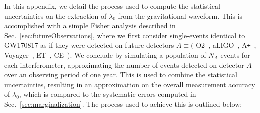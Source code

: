 \documentclass[prd,twocolumn,nofootinbib,superscriptaddress,amsmath,amssymb]{revtex4-1}
\begin{document}
In this appendix, we detail the process used to compute the statistical uncertainties on the extraction of $\lambda_0$ from the gravitational waveform.
This is accomplished with a simple Fisher analysis described in Sec.~\ref{sec:futureObservations}, where we first consider single-events identical to GW170817 as if they were detected on future detectors $A \equiv ($ O2~\cite{aLIGO}, aLIGO~\cite{aLIGO}, A\texttt{+}~\cite{Ap_Voyager_CE}, Voyager~\cite{Ap_Voyager_CE}, ET~\cite{ET}, CE~\cite{Ap_Voyager_CE}$)$.
We conclude by simulating a population of $N_A$ events for each interferometer, approximating the number of events detected on detector $A$ over an observing period of one year.
This is used to combine the statistical uncertainties, resulting in an approximation on the overall measurement accuracy of $\lambda_0$, which is compared to the systematic errors computed in Sec.~\ref{sec:marginalization}.
The process used to achieve this is outlined below:
\end{document}
